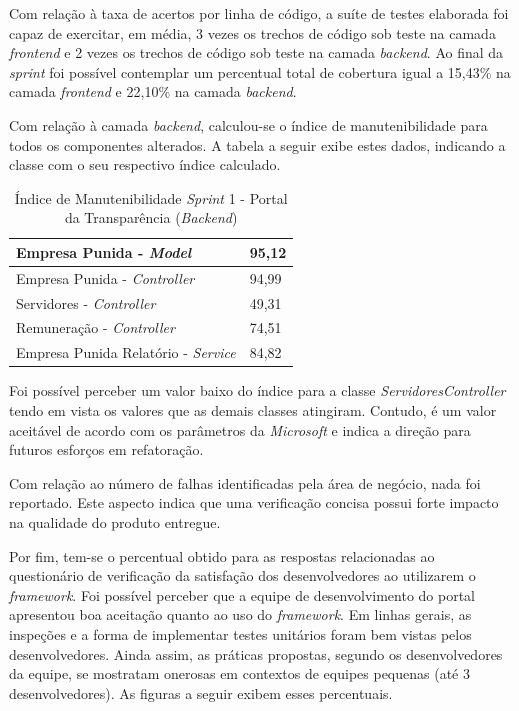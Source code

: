 Com relação à taxa de acertos por linha de código, a suíte de testes elaborada foi capaz de exercitar, em média, 3 vezes os trechos de código sob teste na camada \textit{frontend} e 2 vezes os trechos de código sob teste na camada \textit{backend}. Ao final da \textit{sprint} foi possível contemplar um percentual total de cobertura igual a 15,43\% na camada \textit{frontend} e 22,10\% na camada \textit{backend}.

Com relação à camada \textit{backend}, calculou-se o índice de manutenibilidade para todos os componentes alterados. A tabela a seguir exibe estes dados, indicando a classe com o seu respectivo índice calculado.

\begin{table}[h]
\centering
\begin{tabular}{ | m{10cm} | m{6cm} | } 
\hline
Empresa Punida - \textit{Model} & 95,12 \\ 
\hline
Empresa Punida - \textit{Controller} & 94,99 \\ 
\hline
Servidores - \textit{Controller} & 49,31 \\ 
\hline
Remuneração - \textit{Controller} & 74,51 \\ 
\hline
Empresa Punida Relatório - \textit{Service} & 84,82 \\
\hline
\end{tabular}
\caption{Índice de Manutenibilidade \textit{Sprint} 1 - Portal da Transparência (\textit{Backend})}\label{table:1}
\end{table}

Foi possível perceber um valor baixo do índice para a classe \textit{ServidoresController} tendo em vista os valores que as demais classes atingiram. Contudo, é um valor aceitável de acordo com os parâmetros da \textit{Microsoft} e indica a direção para futuros esforços em refatoração.

Com relação ao número de falhas identificadas pela área de negócio, nada foi reportado. Este aspecto indica que uma verificação concisa possui forte impacto na qualidade do produto entregue.

Por fim, tem-se o percentual obtido para as respostas relacionadas ao questionário de verificação da satisfação dos desenvolvedores ao utilizarem o \textit{framework}. Foi possível perceber que a equipe de desenvolvimento do portal apresentou boa aceitação quanto ao uso do \textit{framework}. Em linhas gerais, as inspeções e a forma de implementar testes unitários foram bem vistas pelos desenvolvedores. Ainda assim, as práticas propostas, segundo os desenvolvedores da equipe, se mostratam onerosas em contextos de equipes pequenas (até 3 desenvolvedores). As figuras a seguir exibem esses percentuais.

